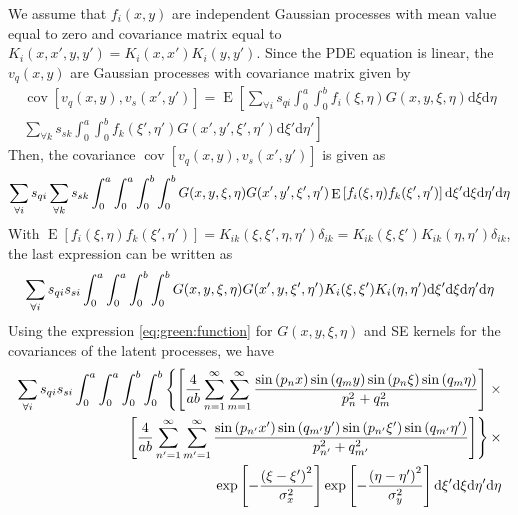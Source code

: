 \documentclass[a4paper,10pt]{article}
\newcommand{\dif}{\textrm{d}}
\DeclareMathOperator{\cov}{cov} \DeclareMathOperator{\ex}{E}
\begin{document}
We assume that $f_i(x,y)$ are independent Gaussian processes with
mean value equal to zero and covariance matrix equal to
$K_i(x,x',y,y')=K_i(x,x')K_i(y,y')$. Since the PDE equation is
linear, the $v_q(x,y)$ are Gaussian processes with covariance matrix
given by
\begin{align}
\cov\left[v_q(x,y),v_s(x',y')\right]=\ex\left[\sum_{\forall
i}s_{qi}\int_0^a\int_0^bf_i(\xi,\eta)G(x,y, \xi,\eta)\dif\xi\dif\eta\right.\\
\left.\sum_{\forall
k}s_{sk}\int_0^{a}\int_0^bf_k(\xi',\eta')G(x',y', \xi',\eta')\dif\xi'\dif\eta'\right]
\end{align}
Then, the covariance $\cov\left[v_q(x,y),v_s(x',y')\right]$ is given
as
\begin{align}\notag
\sum_{\forall i}s_{qi}\sum_{\forall
k}s_{sk}\int_0^a\int_0^{a}\int_0^b\int_0^bG(x,y, \xi,\eta)G(x',y',\xi',\eta')\ex\left[f_i(\xi,\eta)f_k(\xi',\eta')\right]
\dif\xi'\dif\xi\dif\eta'\dif\eta
\end{align}
With
$\ex\left[f_i(\xi,\eta)f_k(\xi',\eta')\right]=K_{ik}(\xi,\xi',\eta,\eta')\delta_{ik}=K_{ik}(\xi,\xi')K_{ik}(\eta,\eta')\delta_{ik}$,
the last expression can be written as
\begin{align}\notag
\sum_{\forall
i}s_{qi}s_{si}\int_0^a\int_0^{a}\int_0^b\int_0^bG(x,y, \xi,\eta)G(x',
  y, \xi',\eta')K_i(\xi,\xi')K_i(\eta,\eta')
\dif\xi'\dif\xi\dif\eta'\dif\eta
\end{align}
Using the expression \eqref{eq:green:function} for $G(x,y, \xi,\eta)$ and SE kernels for the
covariances of the latent processes, we have
\begin{align}\notag
\sum_{\forall
i}s_{qi}s_{si}\int_0^a\int_0^{a}\int_0^b\int_0^b\left\{\left[
\frac{4}{ab}\sum_{n=1}^\infty
                  \sum_{m=1}^\infty\frac{\sin\left({p_n x}\right)
\sin\left(q_m y\right)\sin\left(p_n \xi\right)\sin\left(q_m \eta\right)}{p_n^2 + q_m^2}
\right]\right.\times\\\notag
\left.\left[
\frac{4}{ab}\sum_{n'=1}^\infty
                  \sum_{m'=1}^\infty\frac{\sin\left({p_{n'} x'}\right)
\sin\left(q_{m'} y'\right)\sin\left(p_{n'} \xi'\right)\sin\left(q_{m'} \eta'\right)}{p_{n'}^2 + q_{m'}^2}
\right]\right\}\times\\\notag
\exp\left[-\frac{\left(\xi-\xi'\right)^2}{\sigma^2_x}\right]\exp\left[-\frac{\left(\eta-\eta'\right)^2}{\sigma^2_{y}}\right]\dif\xi'\dif\xi\dif\eta'\dif\eta
\end{align}
\end{document}
